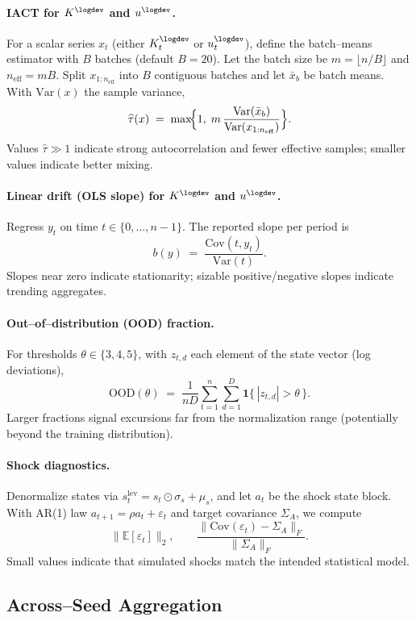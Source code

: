 \documentclass[12pt,english]{article}
\begin{document}
\paragraph{IACT for $K^{\logdev}$ and $u^{\logdev}$.} For a scalar series $x_t$ (either $K^{\logdev}_t$ or $u^{\logdev}_t$), define the batch--means estimator with $B$ batches (default $B=20$). Let the batch size be $m=\lfloor n/B\rfloor$ and $n_{\mathrm{eff}}=mB$. Split $x_{1:n_{\mathrm{eff}}}$ into $B$ contiguous batches and let $\bar{x}_b$ be batch means. With $\mathrm{Var}(x)$ the sample variance,
\[ \widehat{\tau}(x) \;=\; \max\!\Bigl\{1,\; m\,\frac{\mathrm{Var}(\bar{x}_b)}{\mathrm{Var}(x_{1:n_{\mathrm{eff}}})}\Bigr\}. \]
Values $\widehat{\tau}\gg 1$ indicate strong autocorrelation and fewer effective samples; smaller values indicate better mixing.

\paragraph{Linear drift (OLS slope) for $K^{\logdev}$ and $u^{\logdev}$.} Regress $y_t$ on time $t\in\{0,\dots,n-1\}$. The reported slope per period is
\[ b(y) \;=\; \frac{\mathrm{Cov}(t, y_t)}{\mathrm{Var}(t)}. \]
Slopes near zero indicate stationarity; sizable positive/negative slopes indicate trending aggregates.

\paragraph{Out--of--distribution (OOD) fraction.} For thresholds $\theta\in\{3,4,5\}$, with $z_{t,d}$ each element of the state vector (log deviations),
\[ \mathrm{OOD}(\theta) \;=\; \frac{1}{nD}\sum_{t=1}^{n}\sum_{d=1}^{D} \mathbf{1}\{\,|z_{t,d}|>\theta\,\}. \]
Larger fractions signal excursions far from the normalization range (potentially beyond the training distribution).

\paragraph{Shock diagnostics.} Denormalize states via $s^{\mathrm{lev}}_t = s_t\odot\sigma_s + \mu_s$, and let $a_t$ be the shock state block. With AR(1) law $a_{t+1}=\rho a_t + \varepsilon_t$ and target covariance $\Sigma_A$, we compute
\[ \|\mathbb{E}[\varepsilon_t]\|_2,\qquad \frac{\|\mathrm{Cov}(\varepsilon_t)-\Sigma_A\|_F}{\|\Sigma_A\|_F}. \]
Small values indicate that simulated shocks match the intended statistical model.

\subsection{Across--Seed Aggregation}
\end{document}
